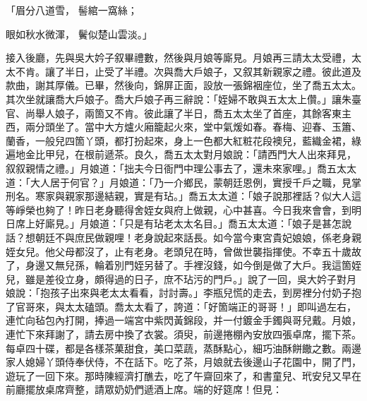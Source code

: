 \begin{showcontents}{}
「眉分八道雪，  髻綰一窩絲；

眼如秋水微渾，  鬢似楚山雲淡。」

接入後廳，先與吳大妗子叙畢禮數，然後與月娘等廝見。月娘再三請太太受禮，太太不肯。讓了半日，止受了半禮。次與喬大戶娘子，又叙其新親家之禮。彼此道及款曲，謝其厚儀。已畢，然後向，錦屏正面，設放一張錦裀座位，坐了喬五太太。其次坐就讓喬大戶娘子。喬大戶娘子再三辭說：「姪婦不敢與五太太上儹。」讓朱臺官、尚舉人娘子，兩箇又不肯。彼此讓了半日，喬五太太坐了首座，其餘客東主西，兩分頭坐了。當中大方爐火廂籠起火來，堂中氣煖如春。春梅、迎春、玉簫、蘭香，一般兒四箇丫頭，都打扮起來，身上一色都大紅粧花段襖兒，藍織金裙，綠遍地金比甲兒，在根前遞茶。良久，喬五太太對月娘說：「請西門大人出來拜見，叙叙親情之禮。」月娘道：「拙夫今日衙門中理公事去了，還未來家哩。」喬五太太道：「大人居于何官？」月娘道：「乃一介鄉民，蒙朝廷恩例，實授千戶之職，見掌刑名。寒家與親家那邊結親，實是有玷。」喬五太太道：「娘子說那裡話？似大人這等崢榮也夠了！昨日老身聽得舍姪女與府上做親，心中甚喜。今日我來會會，到明日席上好廝見。」月娘道：「只是有玷老太太名目。」喬五太太道：「娘子是甚怎說話？想朝廷不與庶民做親哩！老身說起來話長。如今當今東宮貴妃娘娘，係老身親姪女兒。他父母都沒了，止有老身。老頭兒在時，曾做世襲指揮使。不幸五十歲故了，身邊又無兒孫，輪着別門姪另替了。手裡沒錢，如今倒是做了大戶。我這箇姪兒，雖是差役立身，頗得過的日子，庶不玷污的門戶。」說了一回，吳大妗子對月娘說：「抱孩子出來與老太太看看，討討壽。」李瓶兒慌的走去，到房裡分付奶子抱了官哥來，與太太磕頭。喬太太看了，誇道：「好箇端正的哥哥！」即叫過左右，連忙向毡包內打開，捧過一端宮中紫閃黃錦段，并一付鍍金手鐲與哥兒戴。月娘，連忙下來拜謝了，請去房中換了衣裳。須臾，前邊捲棚內安放四張卓席，擺下茶。每卓四十碟，都是各樣茶菓甜食，美口菜蔬，蒸酥點心，細巧油酥餅饊之數。兩邊家人媳婦丫頭侍奉伏侍，不在話下。吃了茶，月娘就去後邊山子花園中，開了門，遊玩了一回下來。那時陳經濟打醮去，吃了午齋回來了，和書童兒、玳安兒又早在前廳擺放桌席齊整，請眾奶奶們遞酒上席。端的好筵席！但見：


\end{showcontents}
